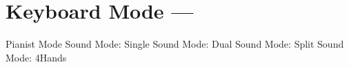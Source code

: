 \section{Keyboard Mode --- }
Pianist Mode
Sound Mode: Single
Sound Mode: Dual
Sound Mode: Split
Sound Mode: 4Hands
